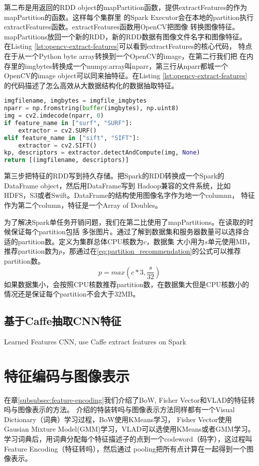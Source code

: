 第二布是用返回的RDD object的mapPartition函数，提供extractFeatures的作为mapPartition的函数。这样每个集群里
的Spark Executor会在本地的partition执行extractFeatures函数。extractFeatures函数用OpenCV把图像
转换图像特征。mapPartitions放回一个新的RDD，新的RDD数据有图像文件名字和图像特征。
在Listing \ref{lst:opencv-extract-features}可以看到extractFeatures的核心代码，
特点在于从一个Python byte array转换到一个OpenCV的image，在第二行我们把
在内存里的imgbytes转换成一个numpy.array叫nparr，第三行从nparr都城一个
OpenCV的image object可以同来抽特征。在Listing \ref{lst:opencv-extract-features}
的代码描述了怎么高效从大数据结构化的数据抽取特征。
\begin{lstlisting}[language=Python,
                   basicstyle=\small,
                   showstringspaces=false,
                   caption={OpenCV从内存读取图像抽取特征},
                   label={lst:opencv-extract-features}]
imgfilename, imgbytes = imgfile_imgbytes
nparr = np.fromstring(buffer(imgbytes), np.uint8)
img = cv2.imdecode(nparr, 0)
if feature_name in ["surf", "SURF"]:
    extractor = cv2.SURF()
elif feature_name in ["sift", "SIFT"]:
    extractor = cv2.SIFT()
kp, descriptors = extractor.detectAndCompute(img, None)
return [(imgfilename, descriptors)]
\end{lstlisting}

第三步把特征的RDD写到持久存储。把Spark的RDD转换成一个Spark的DataFrame object，然后用DataFrame写到
Hadoop兼容的文件系统，比如HDFS，S3或者Swift。DataFrame的结构使用图像名字作为地一个columnn，
特征作为第二个column，特征是一个Array of Doubles。

为了解决Spark单任务开销问题，我们在第二比使用了mapPartitions。在读取的时候保证每个partition包括
多张图片。通过了解到数据集和服务器数量可以选择合适的partition数。定义为集群总体CPU核数为$c$，数据集
大小用为$s$单元使用MB，推荐partition数为$p$，那通过在\ref{eq:partition_recommendation}的公式可以推荐partition数。
\begin{equation} \label{eq:partition_recommendation}
p = max(c * 3, \frac{s}{32})
\end{equation}
如果数据集小，会按照CPU核数推荐partition数，在数据集大但是CPU核数小的情况还是保证每个partition不会大于32MB。


\subsection{基于Caffe抽取CNN特征}
\label{subsec:caffe_cnn}
Learned Features CNN, use Caffe extract features on Spark


\section{特征编码与图像表示}
\label{sec:image-representation}
在章\ref{subsubsec:feature-encoding}我们介绍了BoW, Fisher Vector和VLAD的特征转吗与图像表示的方法。
介绍的特装转吗与图像表示方法同样都有一个Visual Dictionary（词典）学习过程，BoW使用KMeans学习，
Fisher Vector使用Gausian Mixture Model(GMM)学习，VLAD可以选使用KMeans或者GMM学习。
学习词典后，用词典分配每个特征描述子的点到一个codeword（码字），这过程叫Feature Encoding（特征转吗），然后通过
pooling把所有点计算在一起得到一个图像表示。


